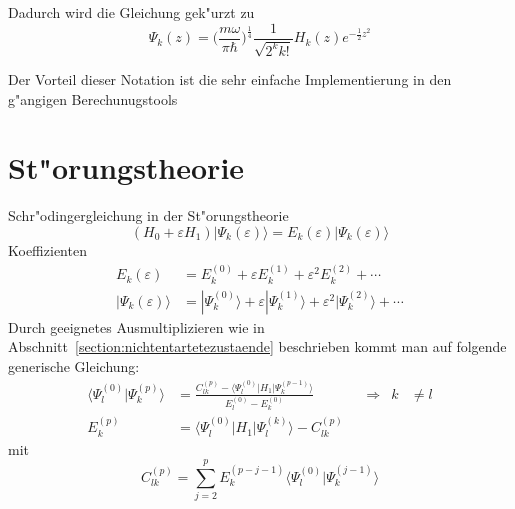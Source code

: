 \begin{refsection}
Dadurch wird die Gleichung gek"urzt zu
\[
\Psi_k(z)
=
\biggl(\frac{m\omega}{\pi\hbar}\biggr)^\frac14
\frac1{\sqrt{2^k k!}}H_k(z)
e^{-\frac12 z^2}
\]

Der Vorteil dieser Notation ist die sehr einfache Implementierung in den g"angigen Berechunugstools

\section{St"orungstheorie}
Schr"odingergleichung in der St"orungstheorie
\[
(H_0+\varepsilon H_1)|\Psi_k(\varepsilon)\rangle
=
E_k(\varepsilon)|\Psi_k(\varepsilon)\rangle
\]
Koeffizienten
\begin{align*}
E_k(\varepsilon)
&=
E_k^{(0)}+\varepsilon E_k^{(1)}+\varepsilon^2 E_k^{(2)}+\dotsb
\\
|\Psi_k(\varepsilon)\rangle
&=
|\Psi_k^{(0)}\rangle+\varepsilon|\Psi_k^{(1)}\rangle+
\varepsilon^2|\Psi_k^{(2)}\rangle+\dotsb
\end{align*}
Durch geeignetes Ausmultiplizieren wie in Abschnitt~\ref{section:nichtentartetezustaende}  beschrieben kommt man auf folgende generische Gleichung:
\begin{equation}
\begin{aligned}
\langle\Psi_l^{(0)}|\Psi_k^{(p)}\rangle
&=
\frac{C_{lk}^{(p)}-\langle\Psi_l^{(0)}|H_1|\Psi_k^{(p-1)}\rangle}
{E_l^{(0)}-E_k^{(0)}}
&&\Rightarrow&
k&\ne l
\\
E_k^{(p)}
&=
\langle\Psi_l^{(0)}|H_1|\Psi_l^{(k)}\rangle-C_{lk}^{(p)}
\end{aligned}
\end{equation}
mit
\[
C_{lk}^{(p)}
=
\displaystyle\sum_{j=2}^{p} E_k^{(p-j-1)}
\langle\Psi_l^{(0)}|\Psi_k^{(j-1)}\rangle
\]


\end{refsection}
